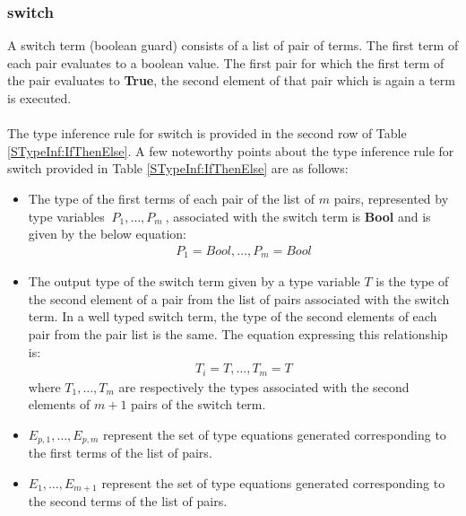 \documentclass[11pt]{article}
\begin{document}
\subsubsection {switch}\label{STypeInf:switch}
A {\sf switch} term (boolean guard) consists of a list of pair of terms. The first term of each pair evaluates to a boolean value. The first pair for which the first term of the pair evaluates to {\bf True}, the second element of that pair which is again a term is executed.
~~\\~~\\ 
The type inference rule for {\sf switch} is provided in the second row of Table \ref {STypeInf:IfThenElse}. A few noteworthy points about the type inference rule for {\sf switch} provided in Table \ref {STypeInf:IfThenElse} are as follows:
\begin{itemize}
  \item The type of the first terms of each pair of the list of ${m}$ pairs, represented by type variables ${~P_1,\ldots,P_m~}$, associated with the {\sf switch} term is {\bf Bool} and is given by the below equation:
  \begin{align*}
    P_1=Bool,\ldots,P_m = Bool
  \end{align*}
 \item The output type of the {\sf switch} term given by a type variable ${T}$ is the type of the second element of a pair from the list of pairs associated with the {\sf switch} term. In a well typed {\sf switch} term, the type of the second elements of each pair from the pair list is the same. The equation expressing this relationship is:
   \begin{align*}
    T_i= T,\ldots,T_m = T
  \end{align*}
  where ${T_1,\ldots,T_m}$ are respectively the types associated with the second elements of ${m+1}$ pairs of the {\sf switch} term.
  \item ${E_{p,1},\ldots,E_{p,m}}$ represent the set of type equations generated corresponding to the first terms of the list of pairs.
  \item ${E_1,\ldots,E_{m+1}}$ represent the set of type equations generated corresponding to the second terms of the list of pairs.
\end{itemize}
\end{document}
